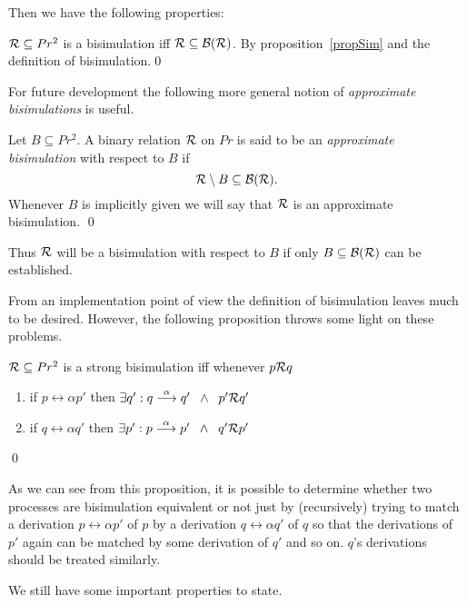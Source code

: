 \noindent
Then we have the following properties:

\begin{proposition}
${\cal R}\subseteq Pr^2$ is a bisimulation iff ${\cal R}\subseteq {\cal B}({\cal R})$.
\proof By proposition~\ref{propSim} and the definition of bisimulation.\qed
\end{proposition}

\noindent
For future development the following more general notion of {\em approximate bisimulations\/} is useful.

\begin{definition}\label{defApproximateBisimulation}
Let $B\subseteq Pr^2$. A binary relation $\cal R$ on $Pr$ is said to be an {\em approximate bisimulation\/} with respect to $B$ if
\[
{\cal R}\setminus B\subseteq {\cal B}({\cal R}).
\]
\noindent
Whenever $B$ is implicitly given we will say that $\cal R$ is an approximate bisimulation.
\qed
\end{definition}

\noindent
Thus $\cal R$ will be a bisimulation with respect to $B$ if only $B\subseteq {\cal B}({\cal R})$ can be established.

From an implementation point of view the definition of bisimulation leaves much to be desired. However, the following proposition throws some light on these problems.

\begin{proposition}
\label{propStrongBisim}
${\cal R}\subseteq Pr^2$ is a strong bisimulation iff whenever $p{\cal R}q$
\begin{enumerate}
\item if $p\rel{\alpha}p'$ then $\exists q': q\stackrel{\alpha}{\longrightarrow}q'\;\;\wedge\;\;p'{\cal R}q'$
\item if $q\rel{\alpha}q'$ then $\exists p': p\stackrel{\alpha}{\longrightarrow}p'\;\;\wedge\;\;q'{\cal R}p'$
\end{enumerate}
\qed
\end{proposition}

\noindent
As we can see from this proposition, it is possible to determine whether two processes are bisimulation equivalent or not just by (recursively) trying to match a derivation $p\rel{\alpha}p'$ of $p$ by a derivation $q\rel{\alpha}q'$ of $q$ so that the derivations of $p'$ again can be matched by some derivation of $q'$ and so on. $q$'s derivations should be treated similarly.

\noindent
We still have some important properties to state.

